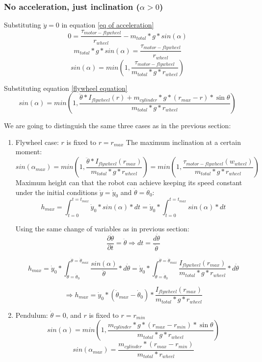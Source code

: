\subsubsection{No acceleration, just inclination ($\alpha > 0$)}
Substituting $\ddot{y}=0$ in equation \ref{eq of acceleration}
\[0 = \frac{\tau_{motor-flywheel}}{r_{wheel}} - m_{total} * g * sin(\alpha)\]
\[m_{total} * g * sin(\alpha) = \frac{\tau_{motor-flywheel}}{r_{wheel}} \]
\[sin(\alpha) = min(1,\frac{\tau_{motor-flywheel}}{m_{total} * g * r_{wheel}}) \]

Substituting equation \ref{flywheel equation}
\[sin(\alpha) = min(1,\frac{\ddot{\theta}*I_{flywheel}(r) + m_{cylinder} * g * (r_{max} - r) * \sin{\theta}}{m_{total} * g * r_{wheel}}) \]


We are going to distinguish the same three cases as in the previous section:
\begin{enumerate}
    \item Flywheel case: $r$ is fixed to $r = r_{max}$
    The maximum inclination at a certain moment:
    \begin{equation}\label{Maximum angle using flywheel system}
        sin(\alpha_{max}) = min(1,\frac{\ddot{\theta}*I_{flywheel}(r_{max})}{m_{total} * g * r_{wheel}}) = min(1,\frac{\tau_{motor-flywheel}(w_{wheel})}{m_{total} * g * r_{wheel}})
    \end{equation}
    Maximum height can that the robot can achieve keeping its speed constant under the initial conditions $\dot{y}=\dot{y}_0$ and $\dot{\theta}=\dot{\theta}_0$:
    \[h_{max}=\int_{t=0}^{t=t_{max}} \dot{y}_0*sin(\alpha) * dt  = \dot{y}_0* \int_{t=0}^{t=t_{max}} sin(\alpha) * dt\]

    Using the same change of variables as in previous section:    
    \[
    \frac{\partial \dot{\theta}}{\partial t} = \ddot{\theta} \Rightarrow dt = \frac{d\dot{\theta}}{\ddot{\theta}}
    \]

    \[h_{max}= \dot{y}_0* \int_{\dot{\theta}=\dot{\theta}_0}^{\dot{\theta}=\dot{\theta}_{max}} \frac{sin(\alpha)}{\ddot{\theta}} * d\dot{\theta} = \dot{y}_0* \int_{\dot{\theta}=\dot{\theta}_0}^{\dot{\theta}=\dot{\theta}_{max}} \frac{I_{flywheel}(r_{max})}{m_{total} * g * r_{wheel}} * d\dot{\theta}\]


    \[\boxed{\Rightarrow h_{max}= \dot{y}_0* (\dot{\theta}_{max}- \dot{\theta}_0) * \frac{I_{flywheel}(r_{max})}{m_{total} * g * r_{wheel}}}\]

    \item Pendulum: $\dot{\theta} = 0$, and $r$ is fixed to $r = r_{min}$
    \[sin(\alpha) = min(1,\frac{m_{cylinder} * g * (r_{max} - r_{min}) * \sin{\theta}}{m_{total} * g * r_{wheel}}) \]
    \begin{equation}\label{Maximum angle using pendulum system}
        sin(\alpha_{max}) = \frac{m_{cylinder} * (r_{max}- r_{min})}{m_{total} * r_{wheel}}
    \end{equation}
\end{enumerate}

